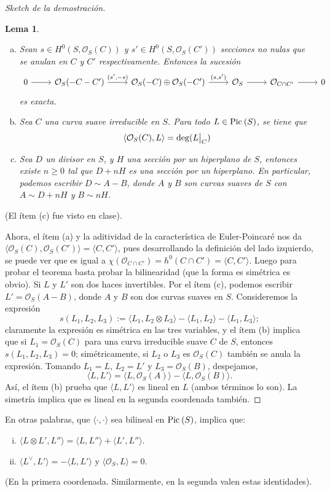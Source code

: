 \documentclass[spanish,12pt]{amsart}
\newcommand{\Pic}[1]{\textup{Pic}{ \: (#1)}}
\newtheorem{lemma}[theorem]{Lema}
\theoremstyle{definition}
\theoremstyle{remark}
\numberwithin{equation}{section}
\newcommand\rest[2]{{%
  \left.\kern-\nulldelimiterspace %
  #1 %
  \vphantom{\big|} %
  \right|_{#2} %
  }}
\renewcommand{\O}{\mathcal{O}}
\begin{document}
\begin{proof}[Sketch de la demostración]


\begin{lemma}
\begin{enumerate}[(a)]
\item Sean $s \in H^0 (S, \O_S (C))$ y $s' \in H^0 (S, \O_S(C'))$ secciones no nulas que se anulan en $C$ y $C'$ respectivamente. Entonces la sucesión
\[
    \begin{tikzcd}
    0 \ar{r} & \O_S (-C - C') \ar{r}{(s',-s)} & \O_S (-C) \oplus \O_S (-C') \ar{r}{(s, s')} & \O_S \ar{r} & \O_{C \cap C'} \ar{r} & 0
    \end{tikzcd}
\]
es exacta.
\item Sea $C$ una curva suave irreducible en $S$. Para todo $L \in \Pic S$, se tiene que
\[
    \langle \O_S (C), L \rangle = \deg (\rest L C)
\]
\item Sea $D$ un divisor en $S$, y $H$ una sección por un hiperplano de $S$, entonces existe $n \geq 0$ tal que $D + n H$ es una sección por un hiperplano. En particular, podemos escribir $D \sim A- B$, donde $A$ y $B$ son curvas suaves de $S$ con $A \sim D + n H$ y $B \sim n H$.
\end{enumerate}
\end{lemma}
(El ítem (c) fue visto en clase).

\bigskip

Ahora, el ítem (a) y la aditividad de la característica de Euler-Poincaré nos da $\langle \O_S (C), \O_S (C')\rangle = \langle  C, C'\rangle$, pues desarrollando la definición del lado izquierdo, se puede ver que es igual a $\chi (\O_{C \cap C'}) = h^0 (C \cap C') = \langle C, C'\rangle$. Luego para probar el teorema basta probar la bilinearidad (que la forma es simétrica es obvio). Si $L$ y $L'$ son dos haces invertibles. Por el ítem (c), podemos escribir $L' = \O_S (A - B)$, donde $A$ y $B$ son dos curvas suaves en $S$. Consideremos la expresión
\[
    s(L_1, L_2,L_3) := \langle L_1, L_2 \otimes L_3 \rangle  - \langle L_1, L_2 \rangle  - \langle L_1, L_3 \rangle;
\]
claramente la expresión es simétrica en las tres variables, y el ítem (b) implica que si $L_1 = \O_S (C)$ para una curva irreducible suave $C$ de $S$, entonces $s(L_1,L_2, L_3) = 0$; simétricamente, si $L_2$ o $L_3$ es $\O_S (C)$ también se anula la expresión. Tomando $L_1 = L$, $L_2 = L'$ y $L_3 = \O_S (B)$, despejamos,
\[
    \langle L, L'\rangle  = \langle L, \O_S (A)\rangle - \langle L, \O_S (B)\rangle.
\]
Así, el ítem (b) prueba que $\langle L, L' \rangle $ es lineal en $L$ (ambos términos lo son). La simetría implica que es lineal en la segunda coordenada también.
\end{proof}
En otras palabras, que $\langle \cdot, \cdot\rangle $ sea bilineal en $\Pic S$, implica que:
\begin{enumerate}[(i)]
\item $ \langle L \otimes L', L'' \rangle = \langle L , L'' \rangle  + \langle L', L''\rangle$.
\item $ \langle L^\vee, L'\rangle  = - \langle L, L'\rangle $ y $\langle \O_S, L\rangle  = 0$.
\end{enumerate}
(En la primera coordenada. Similarmente, en la segunda valen estas identidades).
\end{document}
